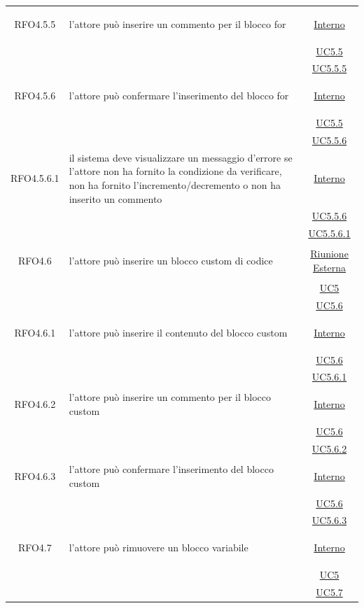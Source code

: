 \begin{itemize}
\begin{itemize}
\begin{itemize}
\begin{itemize}
\begin{longtable}{|c|>{\centering}m{7cm}|c|}
\hypertarget{RFO4.5.5}{RFO4.5.5} & l'attore può inserire un commento per il blocco for & \hyperlink{Interno}{Interno}\\
& &\hyperref[UC5.5]{UC5.5}\\
& &\hyperref[UC5.5.5]{UC5.5.5}\\ \hline

\hypertarget{RFO4.5.6}{RFO4.5.6} & l'attore può confermare l'inserimento del blocco for &  \hyperlink{Interno}{Interno}\\
& &\hyperref[UC5.5]{UC5.5}\\
& &\hyperref[UC5.5.6]{UC5.5.6}\\ \hline

\hypertarget{RFO4.5.6.1}{RFO4.5.6.1} & il sistema deve visualizzare un messaggio d'errore se l'attore non ha fornito la condizione da verificare, non ha fornito l'incremento/decremento o non ha inserito un commento & \hyperlink{Interno}{Interno}\\
& &\hyperref[UC5.5.6]{UC5.5.6}\\
& &\hyperref[UC5.5.6.1]{UC5.5.6.1}\\ \hline

\hypertarget{RFO4.6}{RFO4.6} & l'attore può inserire un blocco custom di codice & \hyperlink{Riunione Esterna}{Riunione Esterna}\\
& &\hyperref[UC5]{UC5}\\
& &\hyperref[UC5.6]{UC5.6}\\ \hline

\hypertarget{RFO4.6.1}{RFO4.6.1} & l'attore può inserire il contenuto del blocco custom & \hyperlink{Interno}{Interno}\\
& &\hyperref[UC5.6]{UC5.6}\\
& &\hyperref[UC5.6.1]{UC5.6.1}\\ \hline

\hypertarget{RFO4.6.2}{RFO4.6.2} & l'attore può inserire un commento per il blocco custom & \hyperlink{Interno}{Interno}\\
& &\hyperref[UC5.6]{UC5.6}\\
& &\hyperref[UC5.6.2]{UC5.6.2}\\ \hline

\hypertarget{RFO4.6.3}{RFO4.6.3} & l'attore può confermare l'inserimento del blocco custom &\hyperlink{Interno}{Interno}\\
& &\hyperref[UC5.6]{UC5.6}\\
& &\hyperref[UC5.6.3]{UC5.6.3}\\ \hline

\hypertarget{RFO4.7}{RFO4.7} & l'attore può rimuovere un blocco variabile &\hyperlink{Interno}{Interno}\\
& &\hyperref[UC5]{UC5}\\
& &\hyperref[UC5.7]{UC5.7}\\ \hline


\end{longtable}
\end{itemize}
\end{itemize}
\end{itemize}
\end{itemize}
